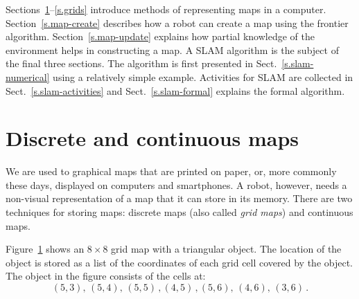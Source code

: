 Sections~\ref{s.maps}--\ref{s.grids} introduce methods of representing maps in a computer. Section~\ref{s.map-create} describes how a robot can create a map using the frontier algorithm. Section~\ref{s.map-update} explains how partial knowledge of the environment helps in constructing a map. A SLAM algorithm is the subject of the final three sections.  The algorithm is first presented in Sect.~\ref{s.slam-numerical} using a relatively simple example. Activities for SLAM are collected in Sect.~\ref{s.slam-activities} and Sect.~\ref{s.slam-formal} explains the formal algorithm.

\section{Discrete and continuous maps}\label{s.maps}

We are used to graphical maps that are printed on paper, or, more commonly these days, displayed on computers and smartphones. A robot, however, needs a non-visual representation of a map that it can store in its memory. There are two techniques for storing maps: discrete maps (also called \emph{grid maps}) and continuous maps.

Figure~\ref{fig.disc} shows an $8\times 8$ grid map with a triangular object. The location of the object is stored as a list of the coordinates of each grid cell covered by the object. The object in the figure consists of the cells at:
\[
(5,3),\, (5,4),\, (5,5)\,, (4,5)\,, (5,6),\, (4,6),\, (3,6)\,.
\]

\begin{figure}
\subfigures
\begin{minipage}{\textwidth}
\hspace{\fill}
\label{fig.disc}
\end{minipage}
\end{figure}

